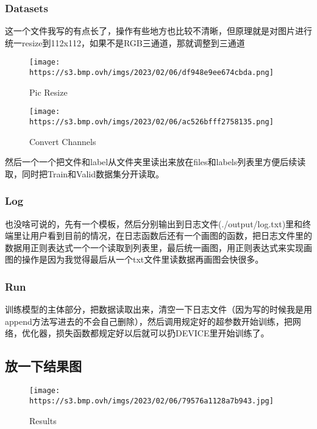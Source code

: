 \hypertarget{datasets}{%
\subsubsection{Datasets}\label{datasets}}

这一个文件我写的有点长了，操作有些地方也比较不清晰，但原理就是对图片进行统一resize到112x112，如果不是RGB三通道，那就调整到三通道

\begin{figure}
\centering
\texttt{[image: https://s3.bmp.ovh/imgs/2023/02/06/df948e9ee674cbda.png]}
\caption{Pic Resize}
\end{figure}

\begin{figure}
\centering
\texttt{[image: https://s3.bmp.ovh/imgs/2023/02/06/ac526bfff2758135.png]}
\caption{Convert Channels}
\end{figure}

然后一个一个把文件和label从文件夹里读出来放在files和labels列表里方便后续读取，同时把Train和Valid数据集分开读取。

\hypertarget{log}{%
\subsubsection{Log}\label{log}}

也没啥可说的，先有一个模板，然后分别输出到日志文件(./output/log.txt)里和终端里让用户看到目前的情况，在日志函数后还有一个画图的函数，把日志文件里的数据用正则表达式一个一个读取到列表里，最后统一画图，用正则表达式来实现画图的操作是因为我觉得最后从一个txt文件里读数据再画图会快很多。

\hypertarget{run}{%
\subsubsection{Run}\label{run}}

训练模型的主体部分，把数据读取出来，清空一下日志文件（因为写的时候我是用append方法写进去的不会自己删除），然后调用规定好的超参数开始训练，把网络，优化器，损失函数都规定好以后就可以扔DEVICE里开始训练了。

\hypertarget{ux653eux4e00ux4e0bux7ed3ux679cux56fe}{%
\subsection{放一下结果图}\label{ux653eux4e00ux4e0bux7ed3ux679cux56fe}}

\begin{figure}
\centering
\texttt{[image: https://s3.bmp.ovh/imgs/2023/02/06/79576a1128a7b943.jpg]}
\caption{Results}
\end{figure}

